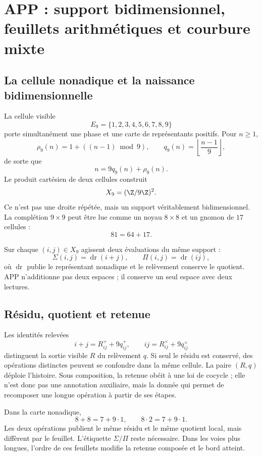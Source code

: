 \chapter{APP : support bidimensionnel, feuillets arithmétiques et courbure mixte}

\section{La cellule nonadique et la naissance bidimensionnelle}

La cellule visible
\[
 E_9=\{1,2,3,4,5,6,7,8,9\}
\]
porte simultanément une phase et une carte de représentants positifs. Pour \(n\ge1\),
\[
 \rho_9(n)=1+((n-1)\bmod9),\qquad
 q_9(n)=\left\lfloor\frac{n-1}{9}\right\rfloor,
\]
de sorte que
\[
 n=9q_9(n)+\rho_9(n).
\]
Le produit cartésien de deux cellules construit
\[
 X_9=(\Z/9\Z)^2.
\]
Ce n'est pas une droite répétée, mais un support véritablement bidimensionnel. La complétion \(9\times9\) peut être lue comme un noyau \(8\times8\) et un gnomon de \(17\) cellules :
\[
81=64+17.
\]

Sur chaque \((i,j)\in X_9\) agissent deux évaluations du même support :
\[
 \Sigma(i,j)=\operatorname{dr}(i+j),\qquad
 \Pi(i,j)=\operatorname{dr}(ij),
\]
où \(\operatorname{dr}\) publie le représentant nonadique et le relèvement conserve le quotient. APP n'additionne pas deux espaces ; il conserve un seul espace avec deux lectures.

\section{Résidu, quotient et retenue}

Les identités relevées
\[
 i+j=R^+_{ij}+9q^+_{ij},\qquad
 ij=R^\times_{ij}+9q^\times_{ij}
\]
distinguent la sortie visible \(R\) du relèvement \(q\). Si seul le résidu est conservé, des opérations distinctes peuvent se confondre dans la même cellule. La paire \((R,q)\) déploie l'histoire. Sous composition, la retenue obéit à une loi de cocycle ; elle n'est donc pas une annotation auxiliaire, mais la donnée qui permet de recomposer une longue opération à partir de ses étapes.

\begin{example}
Dans la carte nonadique,
\[
 8+8=7+9\cdot1,\qquad 8\cdot2=7+9\cdot1.
\]
Les deux opérations publient le même résidu et le même quotient local, mais diffèrent par le feuillet. L'étiquette \(\Sigma/\Pi\) reste nécessaire. Dans les voies plus longues, l'ordre de ces feuillets modifie la retenue composée et le bord atteint.
\end{example}

